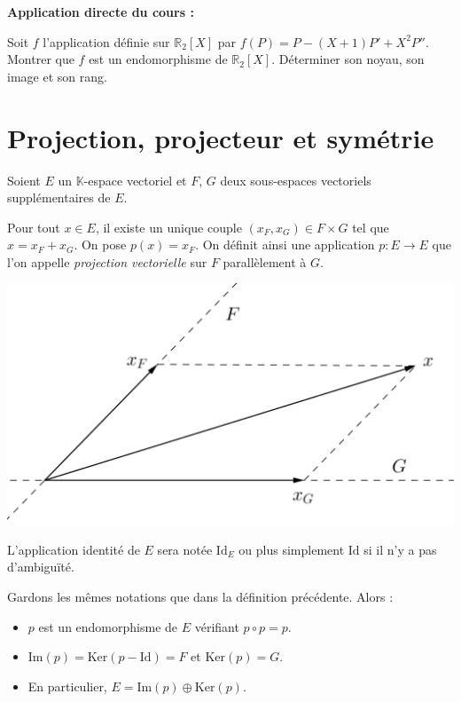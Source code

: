 \documentclass[french,11pt,twoside]{VcCours}
\newenvironment{ApplicationDirecte}{\textbf{Application directe du cours :}

}{}
\begin{document}
\begin{ApplicationDirecte} Soit $f$ l'application définie sur $\mathbb{R}_2[X]$ par $f(P)=P-(X+1)P'+X^2 P''$. Montrer que $f$ est un endomorphisme de $\mathbb{R}_2[X]$. Déterminer son noyau, son image et son rang.
\end{ApplicationDirecte}
\section{Projection, projecteur et symétrie}

\begin{Definition}{} Soient $E$ un $\mathbb{K}$-espace vectoriel et $F$, $G$ deux sous-espaces vectoriels supplémentaires de $E$.

Pour tout $x \in E$, il existe un unique couple $(x_F,x_G) \in F \times G$ tel que $x=x_F+x_G$. On pose $p(x)=x_F$. On définit ainsi une application $p : E \rightarrow E$ que l'on appelle \emph{projection vectorielle} sur $F$ parallèlement à $G$. 
\end{Definition}

\begin{center}
\includegraphics[scale=0.4]{Projection1}
\end{center}

\begin{Notation}{}
	L'application identité de $E$ sera notée $\textrm{Id}_E$ ou plus simplement $\textrm{Id}$ si il n'y a pas d'ambiguïté.
\end{Notation}

\begin{Proposition}{} Gardons les mêmes notations que dans la définition précédente. Alors :
\begin{itemize}
\item $p$ est un endomorphisme de $E$ vérifiant $p \circ p = p$.
\item $\textrm{Im}(p) = \textrm{Ker}(p-\textrm{Id})=F$ et $\textrm{Ker}(p)=G$.
\item En particulier, $E = \textrm{Im}(p) \oplus \textrm{Ker}(p)$.
\end{itemize}
\end{Proposition}
\end{document}
